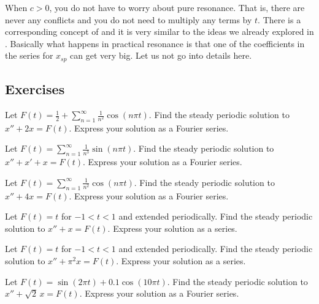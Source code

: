 When $c > 0$, you do not have to worry about pure resonance.  That is,
there are never any conflicts and you do not need to multiply any
terms by $t$.  There is a corresponding concept of
and it is very similar to the ideas we already explored in
.
Basically what happens in practical resonance is that one of the
coefficients in the series for $x_{sp}$ can get very big.  Let us not go
into details here.

\subsection{Exercises}

\begin{exercise}
Let $F(t) = \frac{1}{2} + \sum_{n=1}^\infty \frac{1}{n^2} \cos (n \pi t)$.
Find
the steady periodic solution to
$x'' + 2 x = F(t)$.  Express your solution as a Fourier series.
\end{exercise}

\begin{exercise}
Let $F(t) = \sum_{n=1}^\infty \frac{1}{n^3} \sin (n \pi t)$.  Find
the steady periodic solution to
$x'' + x' + x = F(t)$.  Express your solution as a Fourier series.
\end{exercise}

\begin{exercise}
Let $F(t) = \sum_{n=1}^\infty \frac{1}{n^2} \cos (n \pi t)$.  Find
the steady periodic solution to
$x'' + 4 x = F(t)$.  Express your solution as a Fourier series.
\end{exercise}

\begin{exercise}
Let $F(t) = t$ for $-1 < t < 1$ and extended periodically.
Find the steady periodic solution to
$x'' + x = F(t)$.  Express your solution as a series.
\end{exercise}

\begin{exercise}
Let $F(t) = t$ for $-1 < t < 1$ and extended periodically.
Find the steady periodic solution to
$x'' + \pi^2 x = F(t)$.  Express your solution as a series.
\end{exercise}

\setcounter{exercise}{100}

\begin{exercise}
Let $F(t) = \sin(2\pi t) + 0.1 \cos(10 \pi t)$.
Find the steady periodic solution to $x'' + \sqrt{2}\, x = F(t)$.
Express your solution as a Fourier series.
\end{exercise}

